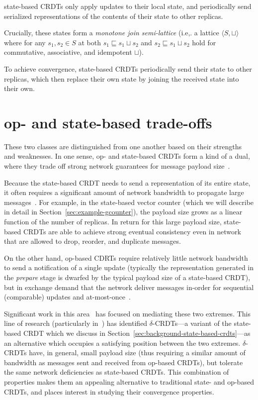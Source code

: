 \begin{definition}
  state-based CRDTs only apply updates to their local state, and periodically
  send serialized representations of the contents of their state to other
  replicas.

  Crucially, these states form a \textit{monotone join semi-lattice} (i.e,. a
  lattice $\langle S, \sqcup \rangle$ where for any $s_1, s_2 \in S$ at both
  $s_1 \sqsubseteq s_1 \sqcup s_2$ and $s_2 \sqsubseteq s_1 \sqcup s_2$ hold for
  commutative, associative, and idempotent $\sqcup$).

  To achieve convergence, state-based CRDTs periodically send their state to
  other replicas, which then replace their own state by joining the received
  state into their own.
\end{definition}

\section{op- and state-based trade-offs}

These two classes are distinguished from one another based on their strengths
and weaknesses. In one sense, op- and state-based CRDTs form a kind of a dual,
where they trade off strong network guarantees for message payload
size~\citep{baquero14}.

Because the state-based CRDT needs to send a representation of its entire state,
it often requires a significant amount of network bandwidth to propagate large
messages~\citep{almedia18}. For example, in the state-based vector counter
(which we will describe in detail in Section~\ref{sec:example-gcounter}), the
payload size grows as a linear function of the number of replicas. In return for
this large payload size, state-based CRDTs are able to achieve strong eventual
consistency even in network that are allowed to drop, reorder, and duplicate
messages.

On the other hand, op-based CDRTs require relatively little network bandwidth to
send a notification of a single update (typically the representation generated
in the \textit{prepare} stage is dwarfed by the typical payload size of a
state-based CRDT), but in exchange demand that the network deliver messages
in-order for sequential (comparable) updates and at-most-once~\citep{shapiro11}.

Significant work in this area~\cite{almedia18, enes18, cabrita17, vanDerLinde16}
has focused on mediating these two extremes. This line of research (particularly
in~\citep{almedia18}) has identified $\delta$-CRDTs---a variant of the
state-based CRDT which we discuss in
Section~\ref{sec:background-state-based-crdts}---as an alternative which
occupies a satisfying position between the two extremes. $\delta$-CRDTs have,
in general, small payload size (thus requiring a similar amount of bandwidth as
messages sent and received from op-based CRDTs), but tolerate the same network
deficiencies as state-based CRDTs. This combination of properties makes them an
appealing alternative to traditional state- and op-based CRDTs, and places
interest in studying their convergence properties.

